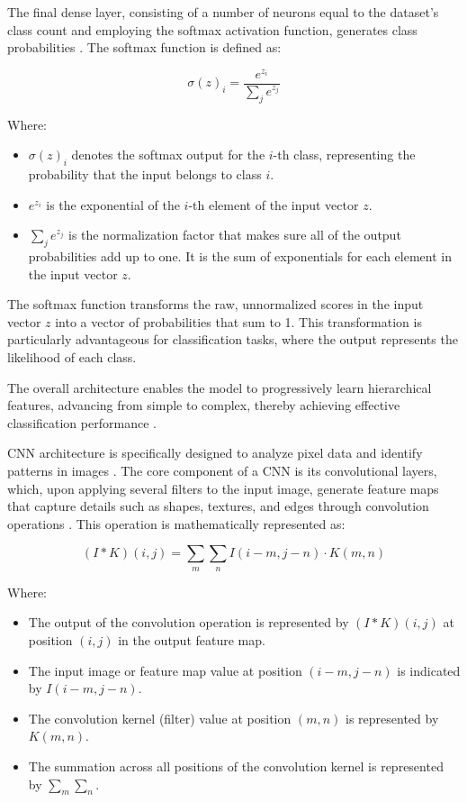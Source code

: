 \documentclass[journal,article,submit,pdftex,moreauthors]{Definitions/mdpi}
\begin{document}
The final dense layer, consisting of a number of neurons equal to the dataset's class count and employing the softmax activation function, generates class probabilities \cite{goodfellow2016deep}. The softmax function is defined as:


\begin{equation}
    \sigma(z)_i = \frac{e^{z_i}}{\sum_{j} e^{z_j}}
\end{equation}

Where:

\begin{itemize}
  \item \(\sigma(z)_i\) denotes the softmax output for the \(i\)-th class, representing the probability that the input belongs to class \(i\).
  \item \(e^{z_i}\) is the exponential of the \(i\)-th element of the input vector \(z\).
  \item \(\sum_{j} e^{z_j}\) is the normalization factor that makes sure all of the output probabilities add up to one. It is the sum of exponentials for each element in the input vector \(z\).
\end{itemize}

The softmax function transforms the raw, unnormalized scores in the input vector \(z\) into a vector of probabilities that sum to 1. This transformation is particularly advantageous for classification tasks, where the output represents the likelihood of each class.

The overall architecture enables the model to progressively learn hierarchical features, advancing from simple to complex, thereby achieving effective classification performance \cite{he2015convolutional}.

CNN architecture is specifically designed to analyze pixel data and identify patterns in images \cite{zeiler2013stochastic}. The core component of a CNN is its convolutional layers, which, upon applying several filters to the input image, generate feature maps that capture details such as shapes, textures, and edges through convolution operations \cite{huang2017densely}. This operation is mathematically represented as:

\begin{equation}
    (I * K)(i, j) = \sum_m \sum_n I(i-m, j-n) \cdot K(m, n)
\end{equation}

Where:

\begin{itemize}
  \item The output of the convolution operation is represented by  \((I * K)(i, j)\) at position \((i, j)\) in the output feature map.
  \item The input image or feature map value at position \((i-m, j-n)\) is indicated by \(I(i-m, j-n)\).
  \item The convolution kernel (filter) value at position \((m, n)\) is represented by \(K(m, n)\).
  \item The summation across all positions of the convolution kernel is represented by \(\sum_m \sum_n\).

\end{itemize}
\end{document}
